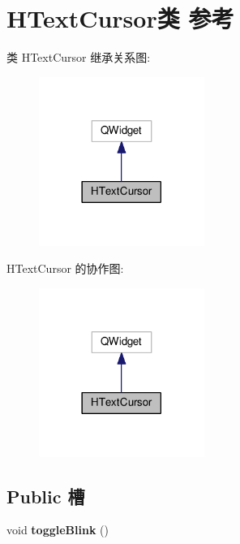 \section{H\+Text\+Cursor类 参考}
\label{class_h_text_cursor}


类 H\+Text\+Cursor 继承关系图\+:\nopagebreak
\begin{figure}[H]
\begin{center}
\leavevmode
\includegraphics[width=153pt]{class_h_text_cursor__inherit__graph}
\end{center}
\end{figure}


H\+Text\+Cursor 的协作图\+:\nopagebreak
\begin{figure}[H]
\begin{center}
\leavevmode
\includegraphics[width=153pt]{class_h_text_cursor__coll__graph}
\end{center}
\end{figure}
\subsection*{Public 槽}
\begin{DoxyCompactItemize}
\item 
void {\bfseries toggle\+Blink} ()\label{class_h_text_cursor_a59202005440d171f2b019ebeae20932d}

\end{DoxyCompactItemize}
